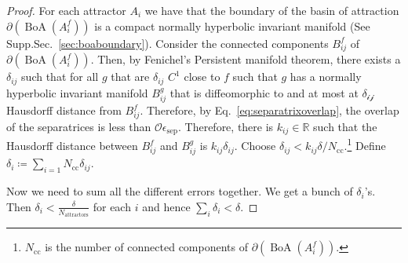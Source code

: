 \documentclass{article}
\theoremstyle{definition}
\theoremstyle{remark}
\newcommand{\reals}{\mathbb{R}}
\newcommand{\cl}{\operatorname{cl}}
\newcommand{\boa}{\operatorname{BoA}}
\newcounter{ct}
\begin{document}
\begin{proof}
%
For each attractor $A_i$ we have that the boundary of the basin of attraction $\partial(\boa(A_i^f))$ is a compact normally hyperbolic invariant manifold (See Supp.Sec.~\ref{sec:boaboundary}).
Consider the connected components $B^f_{ij}$ of $\partial(\boa(A_i^f))$.
Then, by Fenichel's Persistent manifold theorem, there exists a $\delta_{ij}$ such that for all $g$ that are $\delta_{ij}$ $C^1$ close to $f$ such that $g$ has a normally hyperbolic invariant manifold  $B^g_{ij}$ that is diffeomorphic to and at most at $\mathcal{\delta_{ij}}$ Hausdorff distance from $B^f_{ij}$.
Therefore, by Eq.~\ref{eq:separatrixoverlap}, the overlap of the separatrices is less than $\mathcal{O}\epsilon_{\operatorname{sep}}$.%
Therefore, there is $k_{ij}\in\reals$ such that the Hausdorff distance between $B^f_{ij}$ and $B^g_{ij}$ is $k_{ij}\delta_{ij}$.
Choose $\delta_{ij}<k_{ij}\delta/N_{\operatorname{cc}}$.\footnote{$N_{\operatorname{cc}}$ is the number of connected components of $\partial(\boa(A_i^f))$.}%
Define $\delta_i\coloneqq\sum_{i=1}{N_{\operatorname{cc}}}\delta_{ij}$.



Now we need to sum all the different errors together.
We get a bunch of $\delta_i$'s.
Then $\delta_i< \frac{\delta}{N_{\operatorname{attractors}}}$ for each $i$ and hence $\sum_i\delta_i<\delta$.
\end{proof}
\end{document}
